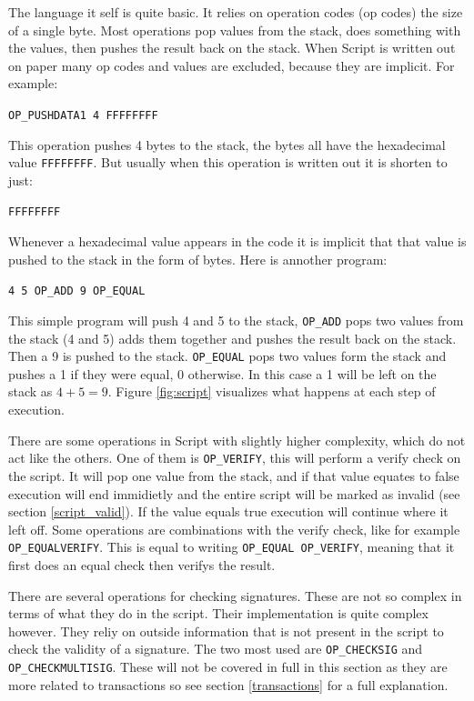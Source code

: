 The language it self is quite basic. It relies on operation codes (op codes) the size of a single byte. Most operations pop values from the stack, does something with the values, then pushes the result back on the stack. When Script is written out on paper many op codes and values are excluded, because they are implicit. For example: 

\texttt{OP\_PUSHDATA1 4 FFFFFFFF} 

This operation pushes 4 bytes to the stack, the bytes all have the hexadecimal value \texttt{FFFFFFFF}. But usually when this operation is written out it is shorten to just:

\texttt{FFFFFFFF} 

Whenever a hexadecimal value appears in the code it is implicit that that value is pushed to the stack in the form of bytes. Here is annother program:

\texttt{4 5 OP\_ADD 9 OP\_EQUAL}

This simple program will push 4 and 5 to the stack, \texttt{OP\_ADD} pops two values from the stack (4 and 5) adds them together and pushes the result back on the stack. Then a 9 is pushed to the stack. \texttt{OP\_EQUAL} pops two values form the stack and pushes a 1 if they were equal, 0 otherwise. In this case a 1 will be left on the stack as $4 + 5 = 9$. Figure \ref{fig:script} visualizes what happens at each step of execution.

There are some operations in Script with slightly higher complexity, which do not act like the others. One of them is \texttt{OP\_VERIFY}, this will perform a verify check on the script. It will pop one value from the stack, and if that value equates to false execution will end immidietly and the entire script will be marked as invalid (see section \ref{script_valid}). If the value equals true execution will continue where it left off. Some operations are combinations with the verify check, like for example \texttt{OP\_EQUALVERIFY}. This is equal to writing \texttt{OP\_EQUAL OP\_VERIFY}, meaning that it first does an equal check then verifys the result.

There are several operations for checking signatures. These are not so complex in terms of what they do in the script. Their implementation is quite complex however. They reliy on outside information that is not present in the script to check the validity of a signature. The two most used are \texttt{OP\_CHECKSIG} and \texttt{OP\_CHECKMULTISIG}. These will not be covered in full in this section as they are more related to transactions so see section \ref{transactions} for a full explanation. 

